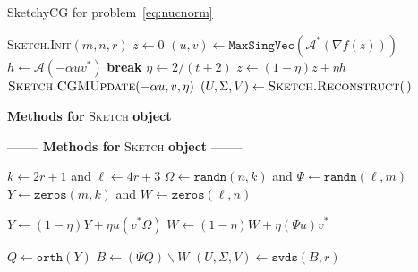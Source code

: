 \documentclass[10pt, twocolumn, reqno, a4paper,oneside]{amsart}
\numberwithin{equation}{section}
\numberwithin{theorem}{section}
\numberwithin{figure}{section}
\numberwithin{table}{section}
\numberwithin{theorem}{section}
\numberwithin{equation}{section}
\begin{document}
\begin{algorithm}
	\caption{SketchyCG for problem~\eqref{eq:nucnorm}
		\label{alg:sketch-CGM}}
	\begin{algorithmic}[1]
		\vspace{0.5pc}

		\State	\textsc{Sketch.Init}$(m, n, r)$
		\State	$z \gets 0$
		\State	$(u, v) \gets \texttt{MaxSingVec}( \mathcal{A}^*(\nabla f( z ) ) )$
		\State	$h \gets \mathcal{A}(-\alpha uv^*)$
		\State \textbf{break}
		\EndIf
		\State	$\eta \gets 2/(t+2)$
		\State	$z \gets (1-\eta) z + \eta h$
		\State	$\textsc{Sketch.CGMUpdate}(-\alpha u, v, \eta)$
		\EndFor
		\State $(U, \Sigma, V) \gets \textsc{Sketch.Reconstruct}(\,)$
		\State {}
		\EndFunction

		\vspace{0.5pc}

		\ifdefined \istwocolumn
		\centerline{\quad
			\textbf{Methods for} \textsc{Sketch} \textbf{object}
			\quad}
		\else
		\centerline{--------\quad
			\textbf{Methods for} \textsc{Sketch} \textbf{object}
			\quad--------}
		\fi

		\vspace{0.5pc}

		\State	$k \gets 2 r + 1$ and $\ell \gets 4 r + 3$
		\State	$\Omega \gets \texttt{randn}(n, k)$ and
		$\Psi \gets \texttt{randn}(\ell, m)$
		\State	$Y \gets \texttt{zeros}(m, k)$ and
		$W \gets \texttt{zeros}(\ell, n)$
		\EndFunction

		\vspace{0.25pc}

		\State $Y \gets (1 - \eta) Y + \eta u (v^* \Omega)$
		\State $W \gets (1 - \eta) W + \eta (\Psi u) v^*$
		\EndFunction

		\vspace{0.25pc}

		\State	$Q \gets \texttt{orth}( Y )$
		\State	$B \gets (\Psi Q) \backslash W$
		\State	$(U, \Sigma, V) \gets \texttt{svds}(B, r)$
		\State {}
		\EndFunction

		\vspace{0.25pc}

	\end{algorithmic}
\end{algorithm}
\end{document}
